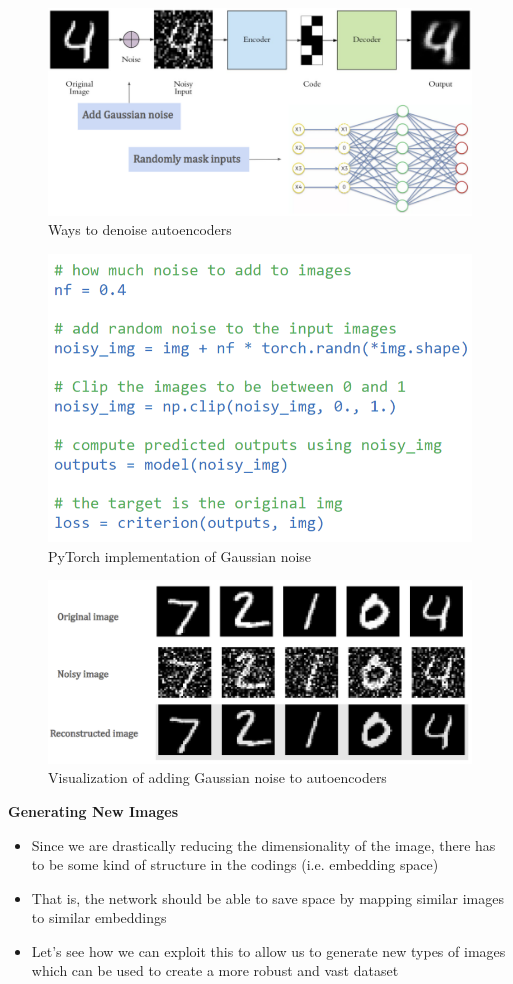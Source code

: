 \begin{figure}[h!t]
    \centering
    \includegraphics[width=0.5\linewidth]{denoiseautoencoders.png}
    \caption{Ways to denoise autoencoders}
    \label{fig:enter-label}
\end{figure}

\begin{figure}[h!t]
    \centering
    \includegraphics[width=0.4\linewidth]{gaussiannoisepy.png}
    \caption{PyTorch implementation of Gaussian noise}
    \label{fig:enter-label}
\end{figure}

\begin{figure}[h!t]
    \centering
    \includegraphics[width=0.4\linewidth]{effectofaddingnoise.png}
    \caption{Visualization of adding Gaussian noise to autoencoders}
    \label{fig:enter-label}
\end{figure}

\textbf{Generating New Images}

\begin{itemize}
    \item Since we are drastically reducing the dimensionality of the image, there has to be
some kind of structure in the codings (i.e. embedding space)
\item That is, the network should be able to save space by mapping similar images to
similar embeddings
\item Let’s see how we can exploit this to allow us to generate new types of images which can be used to create a more robust and vast dataset
\end{itemize}

